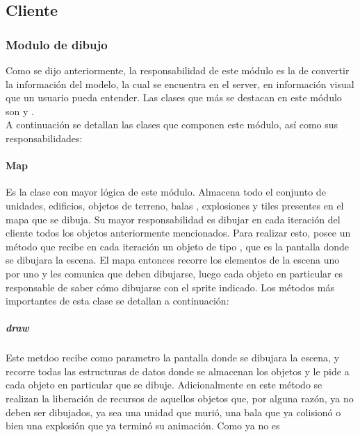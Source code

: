 \subsection{Cliente}
    \subsubsection{Modulo de dibujo}
        Como se dijo anteriormente, la responsabilidad de este módulo es la de
        convertir la información del modelo, la cual se encuentra en el server,
        en información visual que un usuario pueda entender. Las clases que más
        se destacan en este módulo son  y . \\
        A continuación se detallan las clases que componen este módulo, así como
        sus responsabilidades:
        \paragraph{Map}
            Es la clase con mayor lógica de este módulo. Almacena todo el
            conjunto de unidades, edificios, objetos de terreno, balas ,
            explosiones y tiles presentes en el mapa que se dibuja. Su mayor
            responsabilidad es dibujar en cada iteración del cliente todos los
            objetos anteriormente mencionados. Para realizar esto, posee un
            método  que recibe en cada iteración un objeto de tipo
            , que es la pantalla donde se dibujara la escena.
            El mapa entonces recorre los elementos de la escena uno por uno y
            les comunica que deben dibujarse, luego cada objeto en particular
            es responsable de saber cómo dibujarse con el sprite indicado. Los
            métodos más importantes de esta clase se detallan a continuación:
            \def\path{client/Map.jpg}
            \def\scale{.6}
            \def\text{Map}
            
            \subparagraph{draw}
                Este metdoo recibe como parametro la pantalla donde se dibujara la
                escena, y recorre todas las estructuras de datos donde se almacenan
                los objetos y le pide a cada objeto en particular que se dibuje.
                Adicionalmente en este método se realizan la liberación de recursos
                de aquellos objetos que, por alguna razón, ya no deben ser
                dibujados, ya sea una unidad que murió, una bala que ya colisionó o
                bien una explosión que ya terminó su animación. Como ya no es
